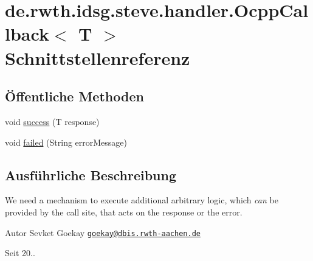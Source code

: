 \hypertarget{interfacede_1_1rwth_1_1idsg_1_1steve_1_1handler_1_1_ocpp_callback_3_01_t_01_4}{\section{de.\-rwth.\-idsg.\-steve.\-handler.\-Ocpp\-Callback$<$ T $>$ Schnittstellenreferenz}
\label{interfacede_1_1rwth_1_1idsg_1_1steve_1_1handler_1_1_ocpp_callback_3_01_t_01_4}
}
\subsection*{Öffentliche Methoden}
\begin{DoxyCompactItemize}
\item 
void \hyperlink{interfacede_1_1rwth_1_1idsg_1_1steve_1_1handler_1_1_ocpp_callback_3_01_t_01_4_a155f022605b4edc7f4b019e08c5bfc2f}{success} (T response)
\item 
void \hyperlink{interfacede_1_1rwth_1_1idsg_1_1steve_1_1handler_1_1_ocpp_callback_3_01_t_01_4_a554723ff83899c716d9b3a3d2fd76c46}{failed} (String error\-Message)
\end{DoxyCompactItemize}


\subsection{Ausführliche Beschreibung}
We need a mechanism to execute additional arbitrary logic, which {\itshape can} be provided by the call site, that acts on the response or the error.

\begin{DoxyAuthor}{Autor}
Sevket Goekay \href{mailto:goekay@dbis.rwth-aachen.de}{\tt goekay@dbis.\-rwth-\/aachen.\-de} 
\end{DoxyAuthor}
\begin{DoxySince}{Seit}
20.. 
\end{DoxySince}


